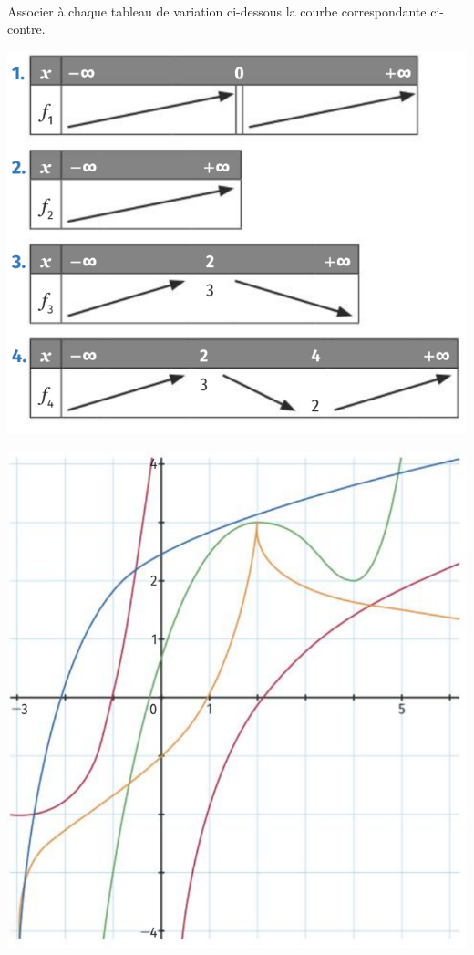 \documentclass[11pt]{article}
\begin{document}
\begin{exo}~\\[2mm]
\begin{minipage}{.5\textwidth}
  Associer à chaque tableau de variation ci-dessous la courbe correspondante
  ci-contre.
  \begin{center}
    \includegraphics[scale=.3]{tableau.png}
  \end{center}
\end{minipage}
\begin{minipage}{.5\textwidth}
  \begin{center}
    \includegraphics[scale=.26]{4courbes1.png}
  \end{center}
\end{minipage}
\end{exo}
\end{document}
